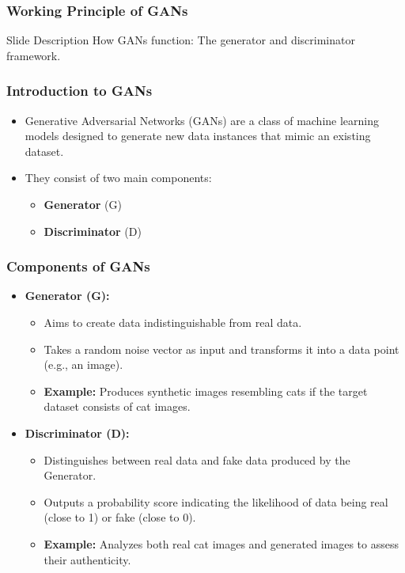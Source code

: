 \documentclass[aspectratio=169]{beamer}
\begin{document}
\begin{frame}[fragile]
    \frametitle{Working Principle of GANs}
    \begin{block}{Slide Description}
        How GANs function: The generator and discriminator framework.
    \end{block}
\end{frame}

\begin{frame}[fragile]
    \frametitle{Introduction to GANs}
    \begin{itemize}
        \item Generative Adversarial Networks (GANs) are a class of machine learning models designed to generate new data instances that mimic an existing dataset.
        \item They consist of two main components:
            \begin{itemize}
                \item \textbf{Generator} (G)
                \item \textbf{Discriminator} (D)
            \end{itemize}
    \end{itemize}
\end{frame}

\begin{frame}[fragile]
    \frametitle{Components of GANs}
    \begin{itemize}
        \item \textbf{Generator (G):}
            \begin{itemize}
                \item Aims to create data indistinguishable from real data.
                \item Takes a random noise vector as input and transforms it into a data point (e.g., an image).
                \item \textbf{Example:} Produces synthetic images resembling cats if the target dataset consists of cat images.
            \end{itemize}
        
        \item \textbf{Discriminator (D):}
            \begin{itemize}
                \item Distinguishes between real data and fake data produced by the Generator.
                \item Outputs a probability score indicating the likelihood of data being real (close to 1) or fake (close to 0).
                \item \textbf{Example:} Analyzes both real cat images and generated images to assess their authenticity.
            \end{itemize}
    \end{itemize}
\end{frame}
\end{document}
